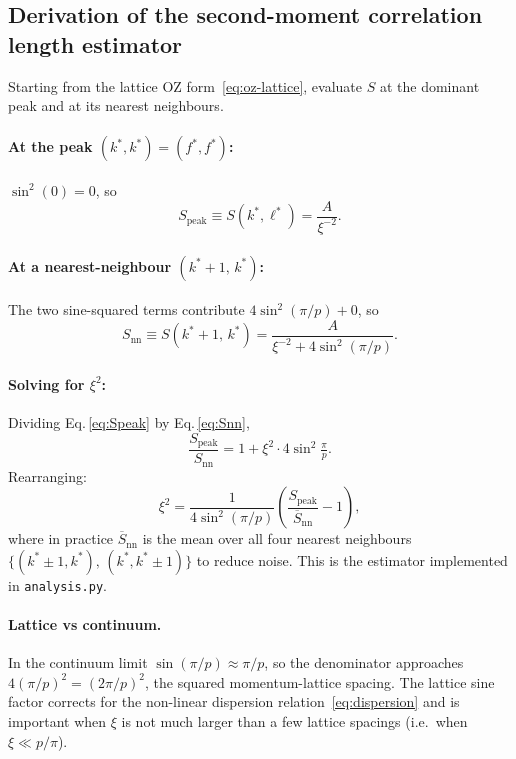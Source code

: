 \documentclass[11pt]{article}
\begin{document}
\subsection{Derivation of the second-moment correlation length estimator}
\label{sec:xi-deriv}

Starting from the lattice OZ form~\eqref{eq:oz-lattice}, evaluate $S$ at
the dominant peak and at its nearest neighbours.

\paragraph{At the peak $(k^*, k^*) = (f^*, f^*)$:}
$\sin^2(0)=0$, so
\begin{equation}
    S_{\mathrm{peak}} \equiv S(k^*,\ell^*)
    = \frac{A}{\xi^{-2}}.
    \label{eq:Speak}
\end{equation}

\paragraph{At a nearest-neighbour $(k^*+1,\, k^*)$:}
The two sine-squared terms contribute $4\sin^2(\pi/p)+0$, so
\begin{equation}
    S_{\mathrm{nn}}
    \equiv S(k^*+1,\,k^*)
    = \frac{A}{\xi^{-2} + 4\sin^2(\pi/p)}.
    \label{eq:Snn}
\end{equation}

\paragraph{Solving for $\xi^2$:}
Dividing Eq.\,\eqref{eq:Speak} by Eq.\,\eqref{eq:Snn},
\begin{equation}
    \frac{S_{\mathrm{peak}}}{S_{\mathrm{nn}}}
    = 1 + \xi^2 \cdot 4\sin^2\!\tfrac{\pi}{p}.
\end{equation}
Rearranging:
\begin{equation}
    \boxed{
    \xi^2 = \frac{1}{4\sin^2(\pi/p)}
            \left(\frac{S_{\mathrm{peak}}}{\overline{S}_{\mathrm{nn}}} - 1\right),
    }
    \label{eq:xi-estimator}
\end{equation}
where in practice $\overline{S}_{\mathrm{nn}}$ is the mean over all four
nearest neighbours $\{(k^*\pm 1, k^*),\, (k^*, k^*\pm 1)\}$ to reduce noise.
This is the estimator implemented in \texttt{analysis.py}.

\paragraph{Lattice vs continuum.}
In the continuum limit $\sin(\pi/p)\approx\pi/p$, so the denominator
approaches $4(\pi/p)^2=(2\pi/p)^2$, the squared momentum-lattice spacing.
The lattice sine factor corrects for the non-linear dispersion
relation~\eqref{eq:dispersion} and is important when $\xi$ is not much
larger than a few lattice spacings (i.e.\ when $\xi \ll p/\pi$).
\end{document}
